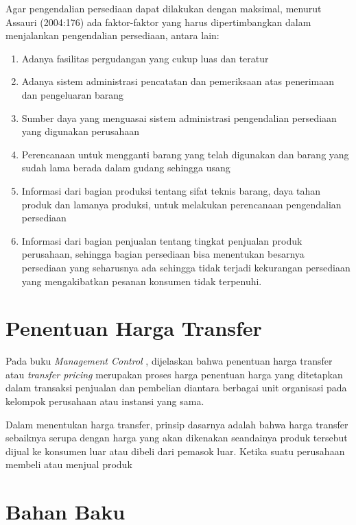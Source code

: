 Agar pengendalian persediaan dapat dilakukan dengan maksimal, menurut Assauri (2004:176) ada faktor-faktor yang harus dipertimbangkan dalam menjalankan pengendalian persediaan, antara lain:

\begin{enumerate}
	\item Adanya fasilitas pergudangan yang cukup luas dan teratur
	\item Adanya sistem administrasi pencatatan dan pemeriksaan atas penerimaan dan pengeluaran barang
	\item Sumber daya yang menguasai sistem administrasi pengendalian persediaan yang digunakan perusahaan
	\item Perencanaan untuk mengganti barang yang telah digunakan dan barang yang sudah lama berada dalam gudang sehingga usang
	\item Informasi dari bagian produksi tentang sifat teknis barang, daya tahan produk dan lamanya produksi, untuk melakukan perencanaan pengendalian persediaan
	\item Informasi dari bagian penjualan tentang tingkat penjualan produk perusahaan, sehingga bagian persediaan bisa menentukan besarnya persediaan yang seharusnya ada sehingga tidak terjadi kekurangan persediaan yang mengakibatkan pesanan konsumen tidak terpenuhi.
\end{enumerate}

\section{Penentuan Harga Transfer}

Pada buku \textit{Management Control} \citep{manajemencontrol}, dijelaskan bahwa penentuan harga transfer atau \textit{transfer pricing} merupakan proses harga penentuan harga yang ditetapkan dalam transaksi penjualan dan pembelian diantara berbagai unit organisasi pada kelompok perusahaan atau instansi yang sama.

Dalam menentukan harga transfer, prinsip dasarnya adalah bahwa harga transfer sebaiknya serupa dengan harga yang akan dikenakan seandainya produk tersebut dijual ke konsumen luar atau dibeli dari pemasok luar. Ketika suatu perusahaan membeli atau menjual produk

\section{Bahan Baku}